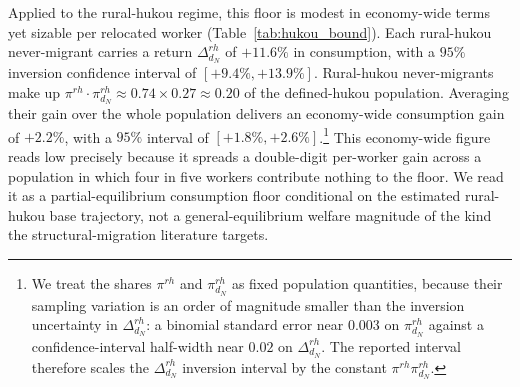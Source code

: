 Applied to the rural-hukou regime, this floor is modest in economy-wide terms yet sizable per relocated worker (Table~\ref{tab:hukou_bound}).
Each rural-hukou never-migrant carries a return $\Delta_{d_N}^{rh}$ of $+11.6\%$ in consumption, with a $95\%$ inversion confidence interval of $[+9.4\%, +13.9\%]$.
Rural-hukou never-migrants make up $\pi^{rh}\cdot\pi_{d_N}^{rh} \approx 0.74 \times 0.27 \approx 0.20$ of the defined-hukou population.
Averaging their gain over the whole population delivers an economy-wide consumption gain of $+2.2\%$, with a $95\%$ interval of $[+1.8\%, +2.6\%]$.\footnote{We treat the shares $\pi^{rh}$ and $\pi_{d_N}^{rh}$ as fixed population quantities, because their sampling variation is an order of magnitude smaller than the inversion uncertainty in $\Delta_{d_N}^{rh}$: a binomial standard error near $0.003$ on $\pi_{d_N}^{rh}$ against a confidence-interval half-width near $0.02$ on $\Delta_{d_N}^{rh}$. The reported interval therefore scales the $\Delta_{d_N}^{rh}$ inversion interval by the constant $\pi^{rh}\pi_{d_N}^{rh}$.}
This economy-wide figure reads low precisely because it spreads a double-digit per-worker gain across a population in which four in five workers contribute nothing to the floor.
We read it as a partial-equilibrium consumption floor conditional on the estimated rural-hukou base trajectory, not a general-equilibrium welfare magnitude of the kind the structural-migration literature targets.



